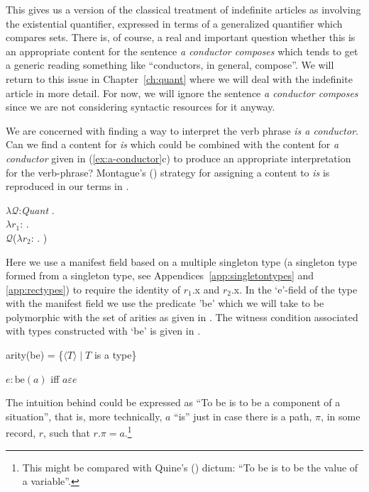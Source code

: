 This gives us a version of the classical treatment of indefinite
articles as involving the existential quantifier, expressed in terms
of a generalized quantifier which compares sets.  There is, of course,
a real and important question whether this is an appropriate content
for the sentence \textit{a conductor composes} which tends to get a
generic reading something like ``conductors, in general, compose''.
We will return to this issue in Chapter~\ref{ch:quant} where we will
deal with the indefinite article in more detail.  For now, we will
ignore the sentence \textit{a conductor composes} since we are not
considering syntactic resources for it anyway.  

We are concerned
with finding a way to interpret the verb phrase \textit{is a
  conductor}.  Can we find a content for \textit{is} which could be
combined with the content for \textit{a conductor} given in
(\ref{ex:a-conductor}c) to produce an appropriate interpretation for
the verb-phrase?  Montague's (\citeyear{Montague1973}) strategy for
assigning a content to \textit{is} is reproduced in our terms in
\nexteg{}.
\begin{ex} 
$\lambda\mathcal{Q}$:\textit{Quant} . \\
\hspace*{1em} $\lambda r_1$:
. \\
\hspace*{2em} $\mathcal{Q}$($\lambda
r_2$:
. )
\label{ex:cont-is} 
\end{ex} 
Here we use a manifest field based on a multiple singleton type (a
singleton type formed from a singleton type, see
Appendices~\ref{app:singletontypes} and \ref{app:rectypes}) to require
the identity of $r_1$.x and $r_2$.x.  In the `e'-field of the type
with the manifest field we use the predicate 'be' which we will take
to be polymorphic with the set of arities  as given in .  The witness
condition associated with types constructed with `be' is given in
.
\begin{ex} 
\begin{subex} 
 
\item arity(be) = \{$\langle T\rangle\mid T$ is a type\} 
 
\item $e:\text{be}(a)$ iff $a\varepsilon e$ 
 
\end{subex} 
   
\end{ex} 
The intuition behind  could be expressed as ``To be is to be
a component of a situation'', that is, more technically, $a$ ``is''
just in case there is a path, $\pi$, 
in some record, $r$, such that $r.\pi=a$.\footnote{This might be
  compared with Quine's (\citeyear{Quine1948}) dictum:  ``To be is to
  be the value of a variable''.}   
  
